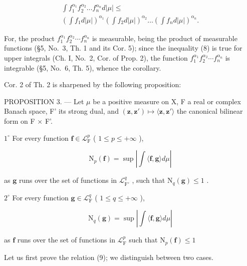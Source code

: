 \[
\begin{array}{l} \int f _ {1} ^ {\alpha_ {1}} f _ {2} ^ {\alpha_ {2}} \dots f _ {n} ^ {\alpha_ {n}} d | \mu | \leqslant \\ \left(\int f _ {1} d | \mu |\right) ^ {\alpha_ {1}} \left(\int f _ {2} d | \mu |\right) ^ {\alpha_ {2}} \dots \left(\int f _ {n} d | \mu |\right) ^ {\alpha_ {n}}. \end{array}\tag{8}
\]

For, the product \(f_{1}^{\alpha_{1}}f_{2}^{\alpha_{2}}\cdots f_{n}^{\alpha_{n}}\) is measurable, being the product of measurable functions (§5, No.~3, Th. 1 and its Cor. 5); since the inequality (8) is true for upper integrals (Ch. I, No.~2, Cor. of Prop. 2), the function \(f_{1}^{\alpha_{1}}f_{2}^{\alpha_{2}}\cdots f_{n}^{\alpha_{n}}\) is integrable (§5, No.~6, Th. 5), whence the corollary.

Cor. 2 of Th. 2 is sharpened by the following proposition:

PROPOSITION 3. --- Let \(\mu\) be a positive measure on X, F a real or complex Banach space, F' its strong dual, and \((\mathbf{z},\mathbf{z}')\mapsto\langle\mathbf{z},\mathbf{z}'\rangle\) the canonical bilinear form on F × F'.

\(1^{\circ}\) For every function \(\mathbf{f} \in \mathcal{L}_{\mathrm{F}}^{p}\) ( \(1 \leqslant p \leqslant +\infty\) ),

\[
\mathrm{N} _ {p} (\mathbf {f}) = \sup \left| \int \langle \mathbf {f}, \mathbf {g} \rangle d \mu \right|\tag{9}
\]

as \(\mathbf{g}\) runs over the set of functions in \(\mathcal{L}_{\mathrm{F}'}^q\) , such that \(\mathrm{N}_q(\mathbf{g}) \leqslant 1\) .

\(2^{\circ}\) For every function \(\mathbf{g} \in \mathcal{L}_{\mathrm{F}}^{q}\) ( \(1 \leqslant q \leqslant +\infty\) ),

\[
\mathrm{N} _ {q} (\mathbf {g}) = \sup \left| \int \langle \mathbf {f}, \mathbf {g} \rangle d \mu \right|\tag{10}
\]

as \(\mathbf{f}\) runs over the set of functions in \(\mathcal{L}_{\mathrm{F}}^{p}\) such that \(\mathrm{N}_p(\mathbf{f})\leqslant 1\)

Let us first prove the relation (9); we distinguish between two cases.

